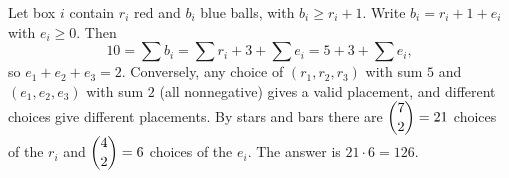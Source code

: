 Let box $i$ contain $r_i$ red and $b_i$ blue balls, with $b_i\ge r_i+1$. Write $b_i=r_i+1+e_i$ with $e_i\ge0$. Then
\[
10=\sum b_i=\sum r_i+3+\sum e_i=5+3+\sum e_i ,
\]
so $e_1+e_2+e_3=2$. Conversely, any choice of $(r_1,r_2,r_3)$ with sum $5$ and $(e_1,e_2,e_3)$ with sum $2$ (all nonnegative) gives a valid placement, and different choices give different placements. By stars and bars there are $\dbinom{7}{2}=21$ choices of the $r_i$ and $\dbinom{4}{2}=6$ choices of the $e_i$. The answer is $21\cdot6=\boxed{126}$.
